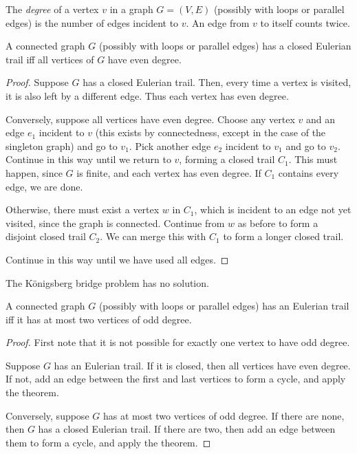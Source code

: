 \begin{definition}[Degree] \label{def:graph:degree}
    The \emph{degree} of a vertex $v$ in a graph $G = (V, E)$ (possibly
    with loops or parallel edges) is the number of edges incident to $v$.
    An edge from $v$ to itself counts twice.
\end{definition}
\begin{theorem*}[Königsberg] \label{thm:graph:euler}
    A connected graph $G$ (possibly with loops or parallel edges) has a
    closed Eulerian trail iff all vertices of $G$ have even degree.
\end{theorem*}
\begin{proof}
    Suppose $G$ has a closed Eulerian trail.
    Then, every time a vertex is visited, it is also left by a different
    edge.
    Thus each vertex has even degree.

    Conversely, suppose all vertices have even degree.
    Choose any vertex $v$ and an edge $e_1$ incident to $v$ (this exists
    by connectedness, except in the case of the singleton graph) and
    go to $v_1$.
    Pick another edge $e_2$ incident to $v_1$ and go to $v_2$.
    Continue in this way until we return to $v$, forming a closed trail
    $C_1$.
    This must happen, since $G$ is finite, and each vertex has even degree.
    If $C_1$ contains every edge, we are done.

    Otherwise, there must exist a vertex $w$ in $C_1$, which is incident
    to an edge not yet visited, since the graph is connected.
    Continue from $w$ as before to form a disjoint closed trail $C_2$.
    We can merge this with $C_1$ to form a longer closed trail.

    Continue in this way until we have used all edges.
\end{proof}
\begin{corollary}
    The Königsberg bridge problem has no solution.
\end{corollary}
\begin{corollary}
    A connected graph $G$ (possibly with loops or parallel edges) has an
    Eulerian trail iff it has at most two vertices of odd degree.
\end{corollary}
\begin{proof}
    First note that it is not possible for exactly one vertex to have odd
    degree.

    Suppose $G$ has an Eulerian trail.
    If it is closed, then all vertices have even degree.
    If not, add an edge between the first and last vertices to form a cycle,
    and apply the theorem.

    Conversely, suppose $G$ has at most two vertices of odd degree.
    If there are none, then $G$ has a closed Eulerian trail.
    If there are two, then add an edge between them to form a cycle,
    and apply the theorem.
\end{proof}


